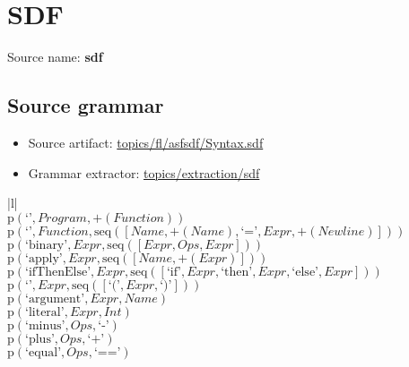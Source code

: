\chapter{SDF}

 Source name: \textbf{sdf}

\section{Source grammar}

\begin{itemize}
\item Source artifact: \href{http://github.com/grammarware/slps/blob/master/topics/fl/asfsdf/Syntax.sdf}{topics/fl/asfsdf/Syntax.sdf}
\item Grammar extractor: \href{http://github.com/grammarware/slps/blob/master/topics/extraction/sdf}{topics/extraction/sdf}
\end{itemize}

\footnotesize\begin{center}\begin{tabular}{|l|}\hline
{}
\\\hline
$\mathrm{p}(\text{`'},\mathit{Program},{+}\left(\mathit{Function}\right))$	\\
$\mathrm{p}(\text{`'},\mathit{Function},\mathrm{seq}\left(\left[\mathit{Name}, {+}\left(\mathit{Name}\right), \text{`='}, \mathit{Expr}, {+}\left(\mathit{Newline}\right)\right]\right))$	\\
$\mathrm{p}(\text{`binary'},\mathit{Expr},\mathrm{seq}\left(\left[\mathit{Expr}, \mathit{Ops}, \mathit{Expr}\right]\right))$	\\
$\mathrm{p}(\text{`apply'},\mathit{Expr},\mathrm{seq}\left(\left[\mathit{Name}, {+}\left(\mathit{Expr}\right)\right]\right))$	\\
$\mathrm{p}(\text{`ifThenElse'},\mathit{Expr},\mathrm{seq}\left(\left[\text{`if'}, \mathit{Expr}, \text{`then'}, \mathit{Expr}, \text{`else'}, \mathit{Expr}\right]\right))$	\\
$\mathrm{p}(\text{`'},\mathit{Expr},\mathrm{seq}\left(\left[\text{`('}, \mathit{Expr}, \text{`)'}\right]\right))$	\\
$\mathrm{p}(\text{`argument'},\mathit{Expr},\mathit{Name})$	\\
$\mathrm{p}(\text{`literal'},\mathit{Expr},\mathit{Int})$	\\
$\mathrm{p}(\text{`minus'},\mathit{Ops},\text{`-'})$	\\
$\mathrm{p}(\text{`plus'},\mathit{Ops},\text{`+'})$	\\
$\mathrm{p}(\text{`equal'},\mathit{Ops},\text{`=='})$	\\
\hline\end{tabular}\end{center}



